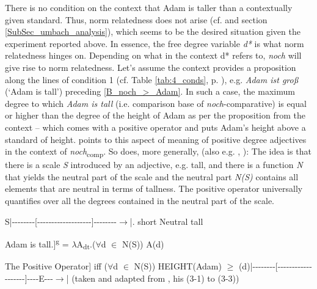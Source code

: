 \documentclass[output=paper,
modfonts
]{langscibook}
\begin{document}
\noindent There is no condition on the context that Adam is taller than a contextually given standard. Thus, norm relatedness does not arise (cf. \citealt{umbach2009a_comp} and section \ref{SubSec_umbach_analysis}), which seems to be the desired situation given the experiment reported above. In essence, the free degree variable \textit{d*} is what norm relatedness hinges on. Depending on what in the context d* refers to, \textit{noch} will give rise to norm relatedness. Let's assume the context provides a proposition along the lines of condition 1 (cf. Table \ref{tab:4_conds}, p. \pageref{tab:4_conds}), e.g. \textit{Adam ist groß} (`Adam is tall') preceding \ref{B_noch_>_Adam}. In such a case, the maximum degree to which \textit{Adam is tall} (i.e. comparison base of \textit{noch}-comparative) is equal or higher than the degree of the height of Adam as per the proposition from the context -- which comes with a positive operator and puts Adam's height above a standard of height. \citeauthor{umbach2009a_comp} \citeyearpar{umbach2009a_comp} points to this aspect of meaning of positive degree adjectives in the context of \textit{noch}\textsubscript{comp}. So does, more generally, \citeauthor{stechow2006} \citeyearpar{stechow2006}(also e.g. \citep{stechow1984}, \citep{Beck2011}): The idea is that there is a scale \textit{S} introduced by an adjective, e.g. tall, and there is a function \textit{N} that yields the neutral part of the scale and the neutral part \textit{N(S)} contains all elements that are neutral in terms of tallness. The positive operator universally quantifies over all the degrees contained in the neutral part of the scale. \citep{stechow2006}

\ea S\hspace{15}|{-}{-}{-}{-}{-}{-}{-}{-}{[}{-}{-}{-}{-}{-}{-}{-}{-}{-}{-}{-}{-}{-}{-}{-}{-}{-}{-}{-}{]}{-}{-}{-}{-}{-}{-}{-}{-}$\to$|\newline \tiny.\normalsize\hspace{22} short \hspace{20} Neutral \hspace{25} tall\z

\ea Adam is tall.\newline [[\textbf{Pos}\textsubscript{N,S}]]\textsuperscript{g} = $\lambda$A\textsubscript{dt}.(\textbf{$\forall$}d $\in$ N(S)) A(d) \z

\ea The Positive Operator\newline [[\textbf{Pos}\textsubscript{N,S}$\lambda$d.tall\textsubscript{S}(d)(Adam)]] iff ($\forall$d $\in$ N(S)) HEIGHT(Adam) $\geq$ (d)\newline|{-}{-}{-}{-}{-}{-}{-}{-}{[}{-}{-}{-}{-}{-}{-}{-}{-}{-}{-}{-}{-}{-}{-}{-}{-}{-}{-}{-}{]}{-}{-}{-}{-}{E}{-}{-}{-}$\to$| \flushright (taken and adapted from \citeauthor{stechow2006} \citeyearpar{stechow2006}, his (3-1) to (3-3))\z
\end{document}
